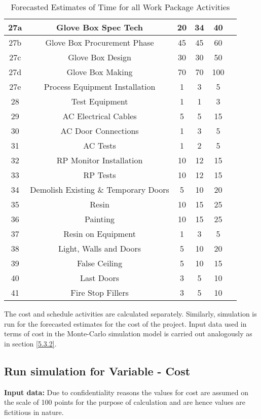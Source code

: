 \begin{table}[ht]
\begin{center}
\begin{tabular}{ |c|c|c|c|c| c|}
		\hline
		27a&Glove Box Spec Tech &20&34&40\\
		\hline
		27b&Glove Box Procurement Phase&45&45&60\\
		\hline
		27c&Glove Box Design&30&30&50\\
		\hline
		27d&Glove Box Making&70&70&100\\
		\hline
		27e&Process Equipment Installation&1&3&5\\
		\hline
		28&Test Equipment&1&1&3\\
		\hline
		29&AC Electrical Cables&5&5&15\\
		\hline
		30&AC Door Connections&1&3&5\\
		\hline
		31&AC Tests&1&2&5\\
		\hline
		32&RP Monitor Installation&10&12&15\\
		\hline
		33&RP Tests&10&12&15\\
		\hline
		34&Demolish Existing \& Temporary Doors&5&10&20\\
		\hline
		35&Resin&10&15&25\\
		\hline
		36&Painting&10&15&25\\
		\hline
		37&Resin on Equipment&1&3&5\\
		\hline
		38&Light, Walls and Doors&5&10&20\\
		\hline
		39&False Ceiling&5&10&15\\
		\hline
		40&Last Doors&3&5&10\\
		\hline
		41&Fire Stop Fillers&3&5&10\\
		\hline
	\end{tabular}
\end{center}

	\caption[Forecasted Estimates of Time for all Work Package Activities]{Forecasted Estimates of Time for all Work Package Activities}
\label{tab:caption5}
\end{table}%


The cost and schedule activities are calculated separately. Similarly, simulation is run for the forecasted estimates for the cost of the project. Input data used in terms of cost in the Monte-Carlo simulation model is carried out analogously as in section \ref{5.3.2}.  


\subsection{Run simulation for Variable - Cost}

\textbf{Input data:}  Due to confidentiality reasons the values for cost are assumed on the scale of 100 points for the purpose of calculation and are hence values are fictitious in nature.

